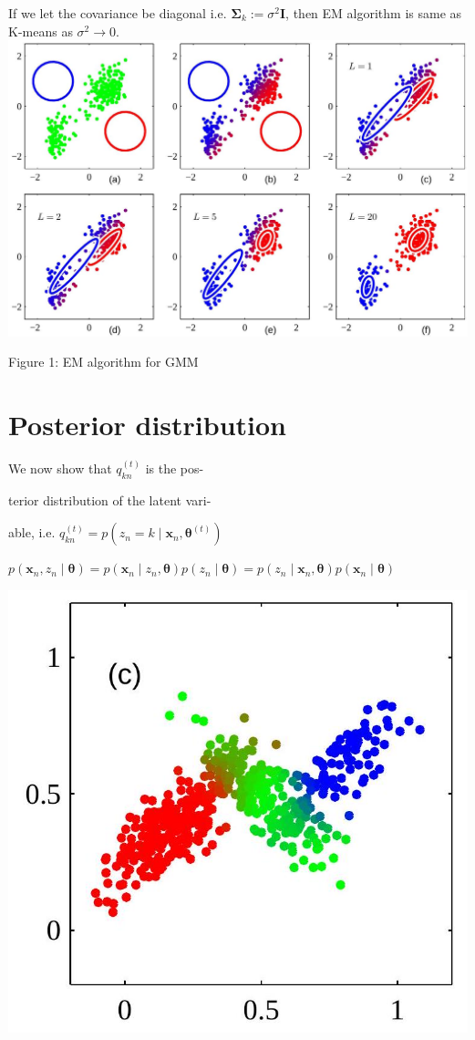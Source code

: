 \documentclass[10pt]{article}
\begin{document}
If we let the covariance be diagonal i.e. $\boldsymbol{\Sigma}_{k}:=\sigma^{2} \mathbf{I}$, then EM algorithm is same as K-means as $\sigma^{2} \rightarrow 0$.
\includegraphics[max width=\textwidth, center]{2023_12_30_e61a87dc872584e254f7g-6(1)}

Figure 1: EM algorithm for GMM

\section*{Posterior distribution}
We now show that $q_{k n}^{(t)}$ is the pos-

terior distribution of the latent vari-

able, i.e. $q_{k n}^{(t)}=p\left(z_{n}=k \mid \mathbf{x}_{n}, \boldsymbol{\theta}^{(t)}\right)$

$p\left(\mathbf{x}_{n}, z_{n} \mid \boldsymbol{\theta}\right)=p\left(\mathbf{x}_{n} \mid z_{n}, \boldsymbol{\theta}\right) p\left(z_{n} \mid \boldsymbol{\theta}\right)=p\left(z_{n} \mid \mathbf{x}_{n}, \boldsymbol{\theta}\right) p\left(\mathbf{x}_{n} \mid \boldsymbol{\theta}\right)$

\begin{center}
\includegraphics[max width=\textwidth]{2023_12_30_e61a87dc872584e254f7g-6}
\end{center}
\end{document}
